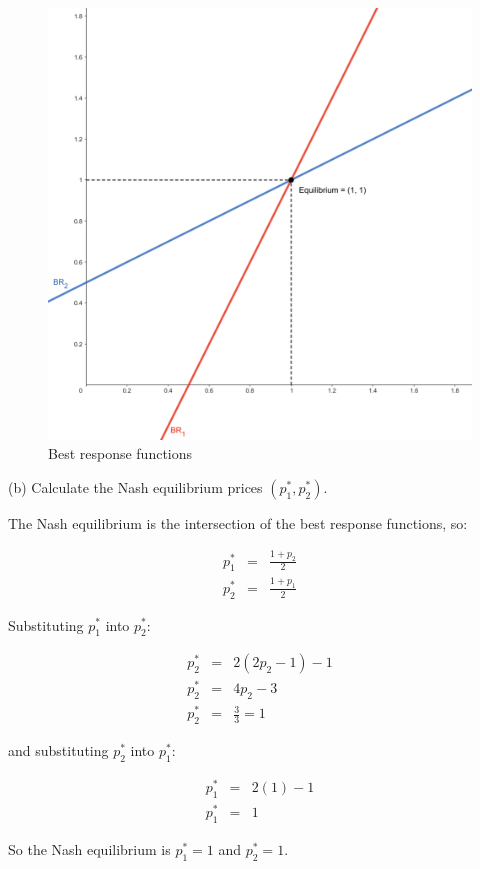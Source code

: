 \begin{figure}[htpb]
    \centering
    \includegraphics[scale=0.4]{plots/plot1.png}
    \caption{Best response functions}
    \label{fig:my_label}
\end{figure}

\begin{tcolorbox}
    (b) Calculate the Nash equilibrium prices $(p_1^*, p_2^*)$.
\end{tcolorbox}
    
The Nash equilibrium is the intersection of the best response functions, so:
    
\begin{eqnarray*}
p_1^* &=& \frac{1 + p_2}{2}\\
p_2^* &=& \frac{1 + p_1}{2}
\end{eqnarray*}
    
Substituting $p_1^*$ into $p_2^*$:
    
\begin{eqnarray*}
p_2^* &=& 2(2p_2 - 1) - 1\\
p_2^* &=& 4p_2 - 3\\
p_2^* &=& \frac{3}{3} = 1
\end{eqnarray*}
    
and substituting $p_2^*$ into $p_1^*$:
    
\begin{eqnarray*}
p_1^* &=& 2(1) - 1\\
p_1^* &=& 1
\end{eqnarray*}
    
\begin{myanswerbox}
    So the Nash equilibrium is $p_1^* = 1$ and $p_2^* = 1$.
\end{myanswerbox}